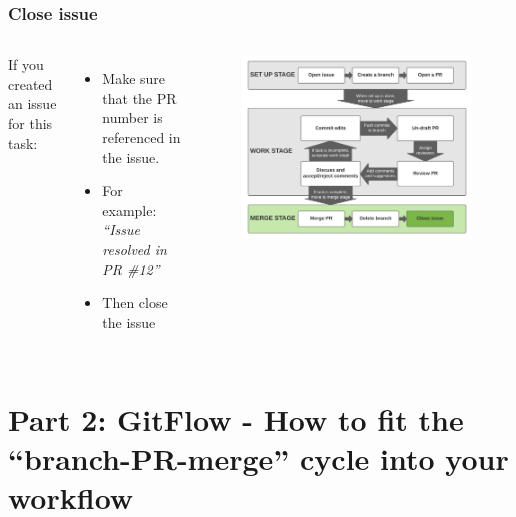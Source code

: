 \documentclass[aspectratio=169]{beamer} %
\begin{document}
\begin{frame}
	\frametitle{Close issue}
	\begin{columns}[c]
		
		If you created an issue for this task:
		\begin{itemize}
			\setlength\itemsep{.5em}
			\item Make sure that the PR number is referenced in the issue. 
			\item For example: \textit{``Issue resolved in PR \#12''}
			\item Then close the issue
		\end{itemize}
		
		\vspace{-.75cm}
		\begin{figure}
			\centering
			\includegraphics[width=\textwidth]{./img/branch-pr-merge-cycle-S3-3.png}
		\end{figure}
		
	\end{columns}
\end{frame}



\section{Part 2: \newline GitFlow - How to fit the ``branch-PR-merge'' cycle into your workflow}
\end{document}
